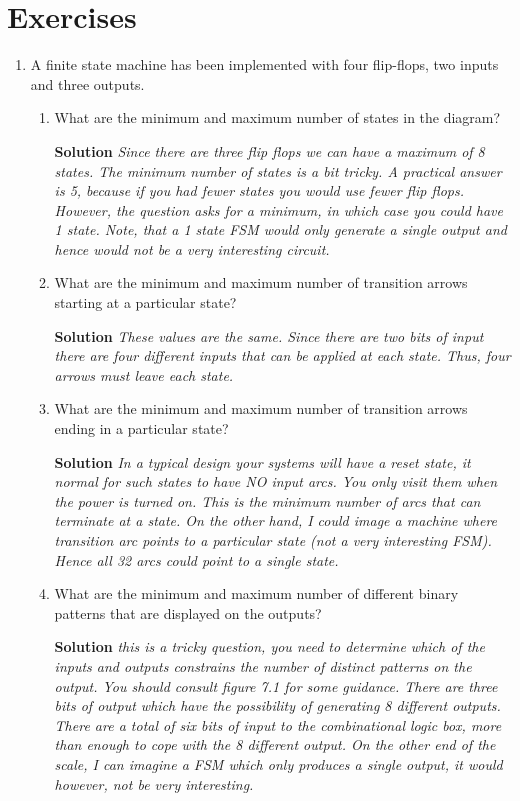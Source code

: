 \section{Exercises}
\label{section:finiteStateMachines}
\graphicspath{ {./chapter07/FigHw} }

\begin{enumerate}
\item A finite state machine has been implemented with four
flip-flops, two inputs and three outputs. 
    \begin{enumerate}
    \item What are the minimum and maximum number of states in the diagram?
\begin{onlysolution}  \textbf{Solution} \itshape{
Since there are three flip flops we can have a maximum of 8 states.  The minimum
number of states is a bit tricky.  A practical answer is 5, because if you
had fewer states you would use fewer flip flops.  However, the question
asks for a minimum, in which case you could have 1 state.  Note, that a
1 state FSM would only generate a single output and hence would not be a
very interesting circuit.
}\end{onlysolution} 
    \item What are the minimum and maximum number of transition arrows 
        starting at a particular state?
\begin{onlysolution}  \textbf{Solution} \itshape{
These values are the same.  Since there are two bits of input there are four
different inputs that can be applied at each state.  Thus, four arrows must
leave each state.
}\end{onlysolution} 
    \item What are the minimum and maximum number of transition arrows 
        ending in a particular state?
\begin{onlysolution}  \textbf{Solution} \itshape{
In a typical design your systems will have a reset state, it normal for such
states to have NO input arcs.  You only visit them when the power is turned on.
This is the minimum number of arcs that can terminate at a state.  On the
other hand, I could image a machine where   transition arc points to a
particular state (not a very interesting FSM).  Hence all 32 arcs could point
to a single state.
}\end{onlysolution} 
    \item What are the minimum and maximum number of different binary patterns
        that are displayed on the outputs? 
\begin{onlysolution}  \textbf{Solution} \itshape{
this is a tricky question, you need to determine which of the inputs and outputs
constrains the number of distinct patterns on the output.  You should consult
figure 7.1 for some guidance.  There are three bits of output which have the possibility
of generating 8 different outputs.  There are a total of six bits of input to the
combinational logic box, more than enough to cope with the 8 different output.  On
the other end of the scale, I can imagine a FSM which only produces a single output,
it would however, not be very interesting.
}\end{onlysolution} 
    \end{enumerate}



\end{enumerate}
